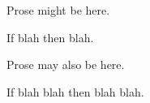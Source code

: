 

Prose might be here.

\begin{theorem}
    If blah then blah.
\end{theorem}

Prose may also be here.

\begin{theorem}
    If blah blah then blah blah.
\end{theorem}

